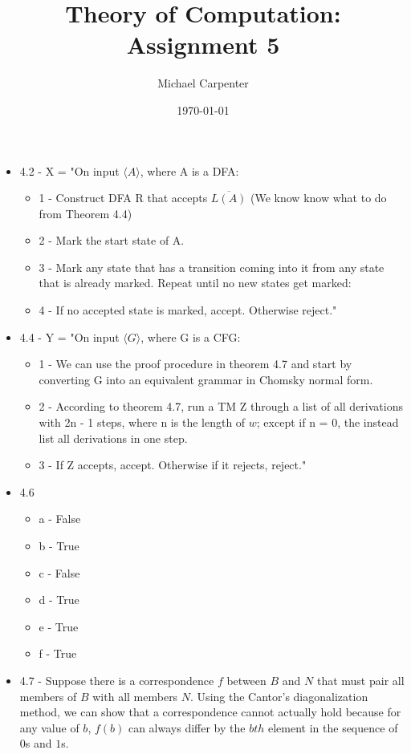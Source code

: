 \documentclass{article}
\title{Theory of Computation: \\ Assignment 5}
\author{Michael Carpenter}
\date{\today}
\begin{document}
\maketitle

\begin{itemize}
  \item 4.2 - X = "On input $\langle A \rangle$, where A is a DFA:
    \begin{itemize}
      \item 1 - Construct DFA R that accepts $\overline{L(A)}$ (We know know what to do from Theorem 4.4)
      \item 2 - Mark the start state of A.
      \item 3 - Mark any state that has a transition coming into it from any state that is already marked. Repeat until no new states get marked:
      \item 4 - If no accepted state is marked, accept. Otherwise reject."
    \end{itemize}
  \item 4.4 - Y = "On input $\langle G \rangle$, where G is a CFG:
    \begin{itemize}
      \item 1 - We can use the proof procedure in theorem 4.7 and start by converting G into an equivalent grammar in Chomsky normal form.
      \item 2 - According to theorem 4.7, run a TM Z through a list of all derivations with 2n - 1 steps, where n is the length of $w$; except if n = 0, the instead list all derivations in one step.
      \item 3 - If Z accepts, accept. Otherwise if it rejects, reject."
    \end{itemize}
  \item 4.6
    \begin{itemize}
      \item a - False
      \item b - True
      \item c - False
      \item d - True
      \item e - True
      \item f - True
    \end{itemize}
  \item 4.7 - Suppose there is a correspondence $f$ between $B$ and $N$ that must pair all members of $B$ with all members $N$. Using the Cantor's diagonalization method, we can show that a correspondence cannot actually hold because for any value of $b$, $f(b)$ can always differ by the $bth$ element in the sequence of $0$s and $1$s.

\end{itemize}
\end{document}
